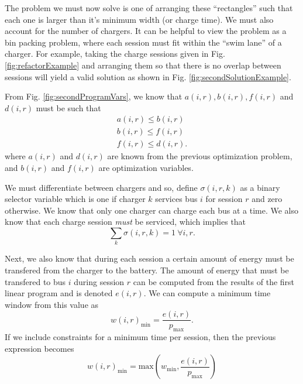\par The problem we must now solve is one of arranging these ``rectangles'' such that each one is larger than it's minimum width (or charge time).  We must also account for the number of chargers. It can be helpful to view the problem as a bin packing problem, where each session must fit within the ``swim lane'' of a charger.  For example, taking the charge sessions given in Fig. \ref{fig:refactorExample} and arranging them so that there is no overlap between sessions will yield a valid solution as shown in Fig. \ref{fig:secondSolutionExample}.
\par From Fig. \ref{fig:secondProgramVars}, we know that $a(i,r), b(i,r),f(i,r)$ and $d(i,r)$ must be such that 
\begin{equation}\label{eqn:assignment:eqn1}\begin{aligned}
	a(i,r) \le b(i,r) \\
	b(i,r) \le f(i,r) \\
	f(i,r) \le d(i,r). 	
\end{aligned}\end{equation}
where $a(i,r)$ and $d(i,r)$ are known from the previous optimization problem, and $b(i,r)$ and $f(i,r)$ are optimization variables. 
\par We must differentiate between chargers and so, define $\sigma(i,r,k)$ as a binary selector variable which is one if charger $k$ services bus $i$ for session $r$ and zero otherwise. We know that only one charger can charge each bus at a time. We also know that each charge session {\it must} be serviced, which implies that
\begin{equation}\label{eqn:assignment:eqn2}
	\sum_k \sigma(i,r,k) = 1  \ \forall i,r.
\end{equation}
\par Next, we also know that during each session a certain amount of energy must be transfered from the charger to the battery.  The amount of energy that must be transfered to bus $i$ during session $r$ can be computed from the results of the first linear program and is denoted $e(i,r)$. We can compute a minimum time window from this value as 
\begin{equation}\label{eqn:assignment:eqn3}
	w(i,r)_{\text{min}} = \frac{e(i,r)}{p_\text{max}}.
\end{equation}
If we include constraints for a minimum time per session, then the previous expression becomes
\begin{equation*}
	w(i,r)_{\text{min}} = \text{max}\left ( w_{\text{min}}, \frac{e(i,r)}{p_\text{max}} \right )
\end{equation*}
